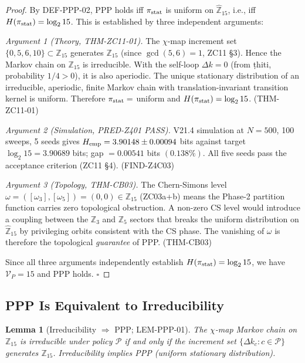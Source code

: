 \documentclass[12pt, a4paper]{article}
\newtheorem{lemma}{Lemma}[section]
\begin{document}
\begin{proof}
By DEF-PPP-02, PPP holds iff $\pi_{\rm stat}$ is uniform on
$\hat{\mathbb{Z}}_{15}$, i.e., iff $H(\pi_{\rm stat}) = \log_2 15$.
This is established by three independent arguments:

\emph{Argument 1 (Theory, THM-ZC11-01).}
The $\chi$-map increment set $\{0, 5, 6, 10\} \subset \mathbb{Z}_{15}$
generates $\mathbb{Z}_{15}$ (since $\gcd(5,6) = 1$, ZC11 \S3).
Hence the Markov chain on $\mathbb{Z}_{15}$ is irreducible.
With the self-loop $\Delta k = 0$ (from ṭhiti, probability $1/4 > 0$),
it is also aperiodic. The unique stationary distribution of an
irreducible, aperiodic, finite Markov chain with translation-invariant
transition kernel is uniform. Therefore $\pi_{\rm stat} = $ uniform
and $H(\pi_{\rm stat}) = \log_2 15$. \hfill (THM-ZC11-01)

\emph{Argument 2 (Simulation, PRED-Z401 PASS).}
V21.4 simulation at $N = 500$, 100 sweeps, 5 seeds gives
$H_{\rm emp} = 3.90148 \pm 0.00094$ bits against target
$\log_2 15 = 3.90689$ bits; gap $= 0.00541$ bits $(0.138\%)$.
All five seeds pass the acceptance criterion (ZC11 \S4).
\hfill (FIND-Z4C03)

\emph{Argument 3 (Topology, THM-CB03).}
The Chern-Simons level $\omega = ([\omega_3], [\omega_5]) = (0,0)
\in \mathbb{Z}_{15}$ (ZC03a+b) means the Phase-2 partition function
carries zero topological obstruction. A non-zero CS level would
introduce a coupling between the $\mathbb{Z}_3$ and $\mathbb{Z}_5$
sectors that breaks the uniform distribution on $\hat{\mathbb{Z}}_{15}$
by privileging orbits consistent with the CS phase. The vanishing of
$\omega$ is therefore the topological \emph{guarantee} of PPP.
\hfill (THM-CB03)

Since all three arguments independently establish
$H(\pi_{\rm stat}) = \log_2 15$, we have $\mathcal{V}_P = 15$
and PPP holds. \hfill$\square$
\end{proof}

\subsection{PPP Is Equivalent to Irreducibility}
\label{sec:thm-ppp02}

\begin{lemma}[Irreducibility $\Rightarrow$ PPP; LEM-PPP-01]
\label{lem:irred-ppp}
The $\chi$-map Markov chain on $\mathbb{Z}_{15}$ is irreducible
under policy $\mathcal{P}$ if and only if the increment set
$\{\Delta k_c : c \in \mathcal{P}\}$ generates $\mathbb{Z}_{15}$.
Irreducibility implies PPP (uniform stationary distribution).
\end{lemma}
\end{document}
